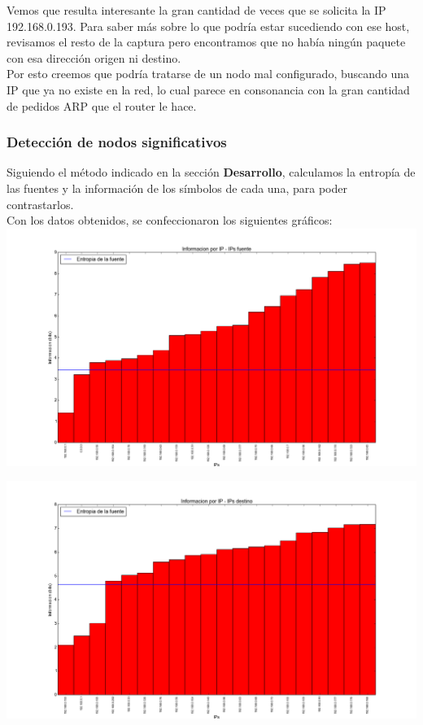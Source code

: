 \indent Vemos que resulta interesante la gran cantidad de veces que se solicita la IP 192.168.0.193. Para saber más sobre lo que podría estar sucediendo con ese host, revisamos el resto de la captura pero encontramos que no había ningún paquete con esa dirección origen ni destino.\\
\indent Por esto creemos que podría tratarse de un nodo mal configurado, buscando una IP que ya no existe en la red, lo cual parece en consonancia con la gran cantidad de pedidos ARP que el router le hace.\\

\subsubsection{Detección de nodos significativos}


\indent \indent Siguiendo el método indicado en la sección \textbf{Desarrollo}, calculamos la entropía de las fuentes y la información de los símbolos de cada una, para poder contrastarlos.\\
\indent Con los datos obtenidos, se confeccionaron los siguientes gráficos:\\

\includegraphics[scale=0.5,clip=true,trim=100 0 0 0]{graphics/tonchis_src.png}

\includegraphics[scale=0.5,clip=true,trim=100 0 0 0]{graphics/tonchis_dst.png}

